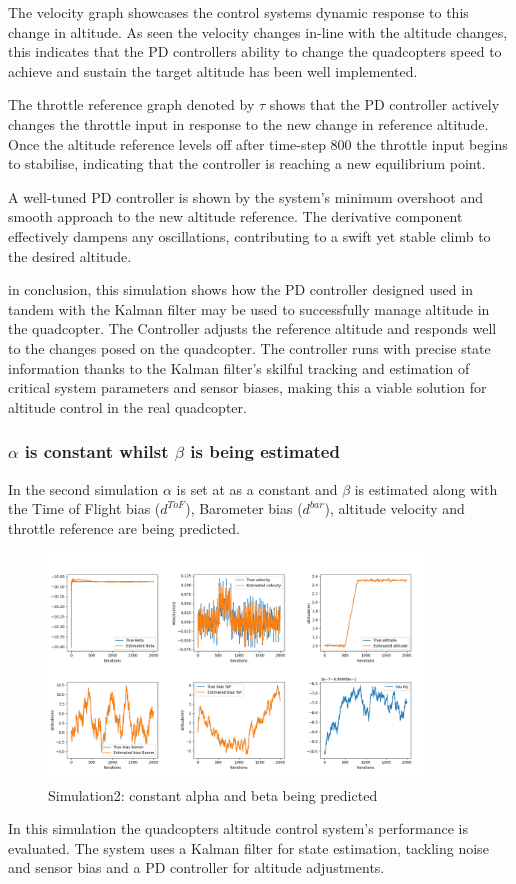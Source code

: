 \documentclass{report}
\begin{document}
The velocity graph showcases the control systems dynamic response to this change
in altitude. As seen the velocity changes in-line with the altitude changes,
this indicates that the PD controllers ability to change the quadcopters speed
to achieve and sustain the target altitude has been well implemented.

The throttle reference graph denoted by \(\tau\) shows that the PD controller
actively changes the throttle input in response to the new change in reference
altitude. Once the altitude reference levels off after time-step 800 the throttle
input begins to stabilise, indicating that the controller is reaching a new
equilibrium point.
 
A well-tuned PD controller is shown by the system's minimum overshoot and smooth
approach to the new altitude reference. The derivative component effectively
dampens any oscillations, contributing to a swift yet stable climb to the
desired altitude.

in conclusion, this simulation shows how the PD controller designed used in
tandem with the Kalman filter may be used to successfully manage altitude in the
quadcopter. The Controller adjusts the reference altitude and responds well to
the changes posed on the quadcopter. The controller runs with precise state
information thanks to the Kalman filter's skilful tracking and estimation of
critical system parameters and sensor biases, making this a viable solution for
altitude control in the real quadcopter.



\subsubsection*{\(\alpha\) is constant whilst \(\beta\) is being estimated}
In the second simulation \(\alpha\) is set at as a constant and \(\beta\) is
estimated along with the Time of Flight bias (\(d^{ToF}\)), Barometer bias
(\(d^{bar}\)), altitude velocity and throttle reference are being predicted.
\begin{figure}[H]
  \centering
  \includegraphics[width=0.9\textwidth]{Pictures/a_constant_PD.png}
  \caption{Simulation2: constant alpha and beta being predicted}
  \label{fig:a_constant_PD}
\end{figure}
In this simulation the quadcopters altitude control system's performance is
evaluated. The system uses a Kalman filter for state estimation, tackling noise
and sensor bias and a PD controller for altitude adjustments.
\end{document}
